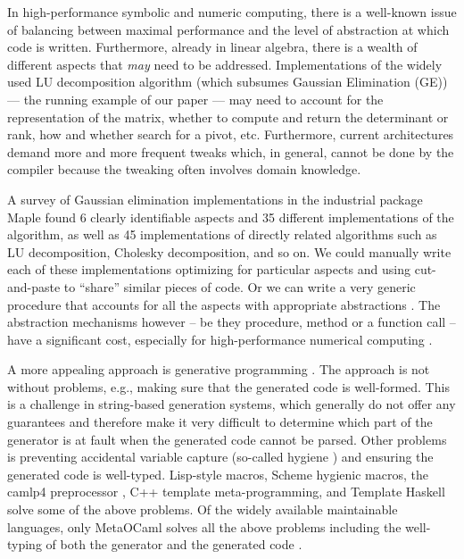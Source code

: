 \documentclass[draft]{elsart}
\begin{document}
In high-performance symbolic and numeric computing, there is a
well-known issue of balancing between maximal performance and the
level of abstraction at which code is written.  Furthermore, already
in linear algebra, there is a wealth of different aspects that
\emph{may} need to be addressed. Implementations of the
widely used LU decomposition algorithm (which subsumes Gaussian 
Elimination (GE)) --- the running
example of our paper --- may need to account for the representation of
the matrix, whether to compute and return the determinant or rank, how
and whether search for a pivot, etc. Furthermore, current architectures
demand more and more frequent tweaks which, in general, cannot be done by the
compiler because the tweaking often involves domain knowledge. 

A survey \cite{carette04} of
Gaussian elimination implementations in the industrial package Maple
found 6 clearly identifiable aspects and 35 different implementations of the
algorithm, as well as 45 implementations of directly related algorithms such as
LU decomposition, Cholesky decomposition, and so on.  We could
manually write each of these implementations optimizing for particular aspects
and using cut-and-paste to ``share'' similar pieces of code.
Or we can write a very generic procedure that accounts for
all the aspects with appropriate abstractions \cite{Axiom}. The
abstraction mechanisms however -- be they procedure, method or a
function call -- have a significant cost, especially for
high-performance numerical computing \cite{carette04}. 

A more appealing approach is generative programming
\cite{Czarnecki,Veldhuizen:1998:ISCOPE,musser94algorithmoriented,BOOST,POOMA,ATLAS}.
The approach is not without problems, e.g., making sure that the
generated code is well-formed. This is a challenge in string-based
generation systems, which generally do not offer any guarantees and
therefore make it very difficult to determine which part of the
generator is at fault when the generated code cannot be parsed. Other
problems is preventing accidental variable capture (so-called hygiene
\cite{HygienicMacros}) and ensuring the generated code is
well-typed. Lisp-style macros, Scheme hygienic macros, the camlp4
preprocessor \cite{camlp4}, C++ template meta-programming, and Template
Haskell \cite{conf/dagstuhl/CzarneckiOST03} solve some of the above
problems. Of the widely available maintainable languages, only
MetaOCaml \cite{CTHL03,metaocaml-org}  solves all the above problems
including the well-typing of both the generator and 
the generated code \cite{TahaSheard97,TahaThesis}.
\end{document}
